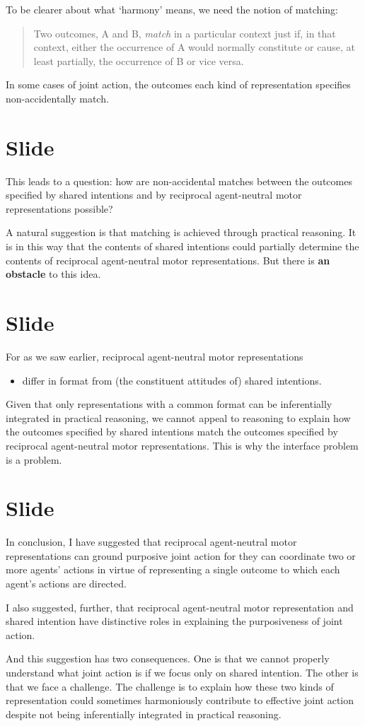 \documentclass[12pt,\papersize]{extarticle}
\begin{document}
To be clearer about what `harmony' means, we need the notion of matching:
\begin{quote}
Two  outcomes, A and B, \emph{match} in a particular context just if, in that context, either the occurrence of A would normally constitute or cause, at least partially, the occurrence of B or vice versa. 
\end{quote}
In some cases of joint action, the outcomes each kind of representation specifies non-accidentally match.



\section{Slide}
This leads to a question: how are non-accidental matches between the outcomes specified by shared intentions and by reciprocal agent-neutral motor representations possible?

A natural suggestion is that matching is achieved through practical reasoning.
It is in this way that the contents of shared intentions could partially determine the contents of reciprocal agent-neutral motor representations.
But there is \textbf{an obstacle} to this idea.


\section{Slide}
For as we saw earlier, reciprocal agent-neutral motor representations
\begin{itemize}
\item differ in format from (the constituent attitudes of) shared intentions.
\end{itemize}

Given that only representations with a common format can be inferentially integrated in practical reasoning,
we cannot appeal to reasoning to explain how the outcomes specified by shared intentions match the outcomes specified by reciprocal agent-neutral motor representations.
This is why the interface problem is a problem.


\section{Slide}
In conclusion,
I have suggested that 
reciprocal agent-neutral motor representations
can 
ground purposive joint action
for they
can coordinate two or more agents' actions in virtue of representing a single outcome to which each agent's actions are directed.

I also suggested, further, that
reciprocal agent-neutral motor representation
and
shared intention  
have distinctive roles in explaining the purposiveness of joint action.

And this suggestion has two consequences.
One is that we cannot properly understand what joint action is if we focus only on shared intention.
The other is that we face a challenge.
The challenge is to explain how these two kinds of representation could sometimes harmoniously contribute to effective joint action despite not being inferentially integrated in practical reasoning.



\end{document}
